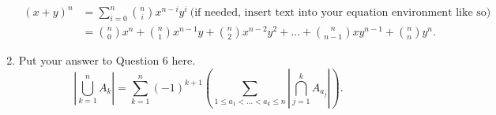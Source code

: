\documentclass{article}
\begin{document}
\begin{enumerate}
    \begin{align*}
        (x + y)^{n} &=	\sum_{i = 0}^{n} \binom{n}{i} x^{n-i}y^{i} \ \text{(if needed, insert text into your equation environment like so)} \\
		        	&=	\binom{n}{0} x^{n} + \binom{n}{1} x^{n-1}y + \binom{n}{2} x^{n-2}y^{2} + \dots + \binom{n}{n-1} xy^{n-1} + \binom{n}{n} y^{n}.
    \end{align*}
    
    \item Put your answer to Question 6 here.
    \begin{equation*}
        \left| \bigcup_{k = 1}^{n} A_{k} \right| = \sum_{k = 1}^{n} (-1)^{k+1} \left( \sum_{1 \leq a_{1} < \dots < a_{k} \leq n} \left| \bigcap_{j=1}^{k} A_{a_j} \right| \right).
    \end{equation*}
\end{enumerate}
\end{document}
